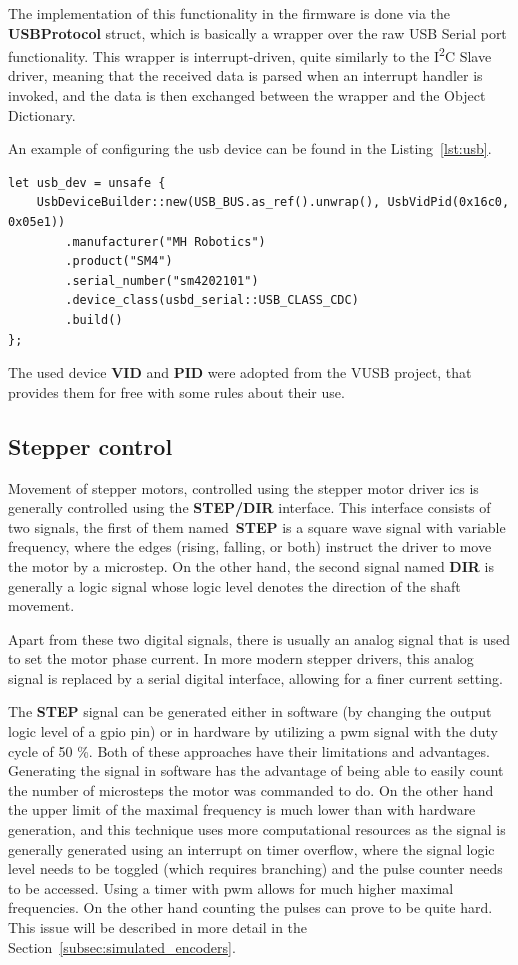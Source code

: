 The implementation of this functionality in the firmware is done via the \textbf{USBProtocol} struct, which is basically a wrapper over the raw USB Serial port functionality.
This wrapper is interrupt-driven, quite similarly to the I\textsuperscript{2}C Slave driver, meaning that the received data is parsed when an interrupt handler is invoked, and the data is then exchanged between the wrapper and the Object Dictionary.

An example of configuring the \acs{usb} device can be found in the Listing~\ref{lst:usb}.
\newpage
\begin{lstlisting}[caption={Initializing the USB device with the CDC-ACM class.},label=lst:usb]
let usb_dev = unsafe {
    UsbDeviceBuilder::new(USB_BUS.as_ref().unwrap(), UsbVidPid(0x16c0, 0x05e1))
        .manufacturer("MH Robotics")
        .product("SM4")
        .serial_number("sm4202101")
        .device_class(usbd_serial::USB_CLASS_CDC)
        .build()
};
\end{lstlisting}
The used device \textbf{VID} and \textbf{PID} were adopted from the VUSB project\cite{noauthor_obdevv-usb_nodate}, that provides them for free with some rules about their use.

\subsection{Stepper control}
\label{subsec:stepper_control}
Movement of stepper motors, controlled using the stepper motor driver \acs{ic}s is generally controlled using the \textbf{STEP/DIR} interface.
This interface consists of two signals, the first of them named~\textbf{STEP} is a square wave signal with variable frequency, where the edges (rising, falling, or both) instruct the driver to move the motor by a microstep.
On the other hand, the second signal named \textbf{DIR} is generally a logic signal whose logic level denotes the direction of the shaft movement.

Apart from these two digital signals, there is usually an analog signal that is used to set the motor phase current.
In more modern stepper drivers, this analog signal is replaced by a serial digital interface, allowing for a finer current setting.

The \textbf{STEP} signal can be generated either in software (by changing the output logic level of a \acs{gpio} pin) or in hardware by utilizing a \acs{pwm} signal with the duty cycle of 50 \%.
Both of these approaches have their limitations and advantages.
Generating the signal in software has the advantage of being able to easily count the number of microsteps the motor was commanded to do.
On the other hand the upper limit of the maximal frequency is much lower than with hardware generation, and this technique uses more computational resources as the signal is generally generated using an interrupt on timer overflow, where the signal logic level needs to be toggled (which requires branching) and the pulse counter needs to be accessed.
Using a timer with \acs{pwm} allows for much higher maximal frequencies.
On the other hand counting the pulses can prove to be quite hard.
This issue will be described in more detail in the Section~\ref{subsec:simulated_encoders}.

